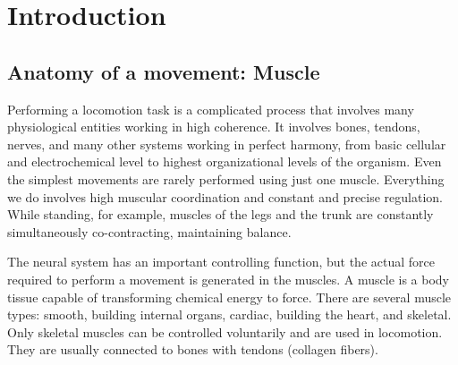 

\chapter{Introduction}


\section{Anatomy of a movement: Muscle} %
Performing a locomotion task is a complicated process that involves many physiological entities working in high coherence. It involves bones, tendons, nerves, and many other systems working in perfect harmony, from basic cellular and electrochemical level to highest organizational levels of the organism. Even the simplest movements are rarely performed using just one muscle. Everything we do involves high muscular coordination and constant and precise regulation. While standing, for example, muscles of the legs and the trunk are constantly simultaneously co-contracting, maintaining balance.  

The neural system has an important controlling function, but the actual force required to perform a movement is generated in the muscles. A muscle is a body tissue capable of transforming chemical energy to force. There are several muscle types: smooth, building internal organs, cardiac, building the heart, and skeletal. Only skeletal muscles can be controlled voluntarily and are used in locomotion. They are usually connected to bones with tendons (collagen fibers).

